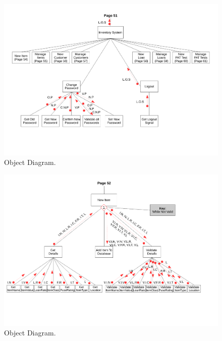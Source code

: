 \begin{landscape}
\begin{figure}[H]
    \begin{center}
    \includegraphics[width=500px]{./Design/top_down_design/inventory_system.pdf}
    \caption{Object Diagram.} \label{fig:object_diagram}
    \end{center}
\end{figure}

\newpage

\begin{figure}[H]
    \begin{center}
    \includegraphics[width=500px]{./Design/top_down_design/new_item.pdf}
    \caption{Object Diagram.} \label{fig:object_diagram}
    \end{center}
\end{figure}


\end{landscape}
